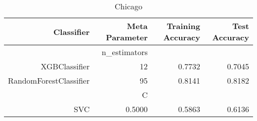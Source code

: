 
\begin{table}[H]
    \caption{Chicago}
    \centering
    \begin{tabular}{|r|r|r|r|}
        \hline
        Classifier &Meta Parameter &Training Accuracy
        &Test Accuracy\\
        \hline
        &n\_estimators &\multicolumn{2}{|r|}{}\\
        \hline
        XGBClassifier &12 &0.7732 &0.7045\\
        \hline
        RandomForestClassifier &95 &0.8141 &0.8182\\
        \hline
        &C &\multicolumn{2}{|r|}{}\\
        \hline
        SVC &0.5000 &0.5863 &0.6136\\
        \hline
    \end{tabular}
\end{table}
